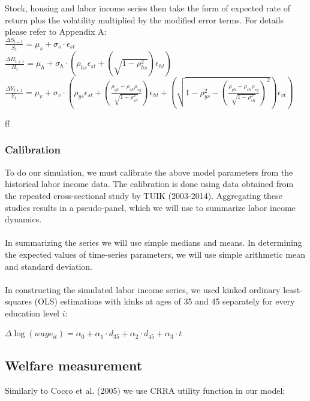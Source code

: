 \documentclass[]{elsarticle}
\begin{document}
Stock, housing and labor income series then take the form of expected rate of return plus the volatility multiplied by the modified error terms. For details please refer to Appendix A:\\
$\frac{\Delta S_{t+1}}{S_t} = \mu_s + \sigma_s \cdot \epsilon_{st}$\\
$\frac{\Delta H_{t+1}}{H_t} = \mu_h + \sigma_h \cdot \left(\rho_{hs}\epsilon_{st} + (\sqrt{1-\rho^2_{hs}})\epsilon_{ht}\right)$\\
$\frac{\Delta Y_{t+1}}{Y_t} = \mu_v + \sigma_v \cdot \left(\rho_{ys}\epsilon_{st} + \left(\frac{\rho_{yh} - \rho_{sh}\rho_{sy}}{\sqrt{1-\rho^2_{sh}}}\right)\epsilon_{ht} + \left(\sqrt{1-\rho^2_{ys}-(\frac{\rho_{yh} - \rho_{sh}\rho_{sy}}{\sqrt{1-\rho^2_{sh}}})^2}\right)\epsilon_{vt}\right)$

ff
\subsubsection{Calibration}

To do our simulation, we must calibrate the above model parameters from the historical labor income data. The calibration is done using data obtained from the repeated cross-sectional study by TUIK (2003-2014). Aggregating these studies results in a pseudo-panel, which we will use to summarize labor income dynamics.

\paragraph{}
In summarizing the series we will use simple medians and means. In determining the expected values of time-series parameters, we will use simple arithmetic mean and standard deviation.

\paragraph{}
In constructing the simulated labor income series, we used kinked ordinary least-squares (OLS) estimations with kinks at ages of 35 and 45 separately for every education level $i$:

\begin{center}
	$\Delta\log (wage_{it}) = \alpha_0 + \alpha_1 \cdot d_{35} + \alpha_2 \cdot d_{45} + \alpha_3 \cdot t$
\end{center}




\subsection{Welfare measurement}
Similarly to Cocco et al. (2005) we use CRRA utility function in our model:
\end{document}
